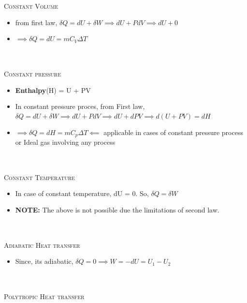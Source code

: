 \documentclass[8pt]{article}
\begin{document}
\\\\
\textsc{Constant Volume}
	\begin{itemize}
		\item from first law, $\delta Q = dU + \delta W \implies dU + PdV \implies dU + 0$
		\item $\implies \delta Q = dU = mC_V\Delta T$
	\end{itemize}\hrulefill\\\\
\textsc{Constant pressure}
	\begin{itemize}
		\item \textbf{Enthalpy}(H) = U + PV
		\item In constant pressure proces, from First law, $\delta Q = dU + \delta W \implies dU + PdV \implies dU + dPV \implies d(U+PV) = dH$
		\item $\implies \delta Q = dH = mC_p\Delta T \impliedby$ applicable in cases of constant pressure process or Ideal gas involving any process
	\end{itemize}\hrulefill\\\\
\textsc{Constant Temperature}
	\begin{itemize}
		\item In case of constant temperature, dU = 0. So, $\delta Q = \delta W$
		\item \textbf{NOTE: } The above is not possible due the limitations of second law.
	\end{itemize}\hrulefill\\\\
\textsc{Adiabatic Heat transfer}
	\begin{itemize}
		\item Since, its adiabatic, $\delta Q = 0 \implies W = -dU = U_1 - U_2$
	\end{itemize}\hrulefill\\\\
\textsc{Polytropic Heat transfer}
\end{document}

